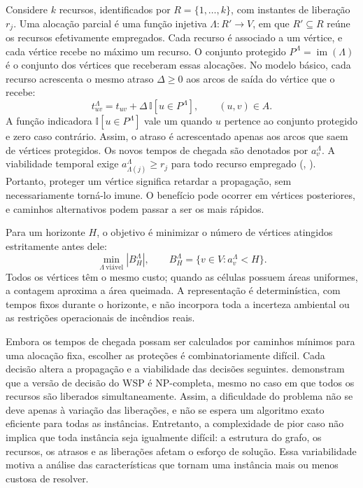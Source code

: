 Considere $k$ recursos, identificados por $R=\{1,\ldots,k\}$, com instantes
de liberação $r_j$. Uma alocação parcial é uma função injetiva
$\Lambda:R'\rightarrow V$, em que $R'\subseteq R$ reúne os recursos
efetivamente empregados. Cada recurso é associado a um vértice, e cada
vértice recebe no máximo um recurso. O conjunto protegido
$P^{\Lambda}=\operatorname{im}(\Lambda)$ é o conjunto dos vértices
que receberam essas alocações. No modelo básico,
cada recurso acrescenta o mesmo atraso $\Delta\geq0$ aos arcos de saída
do vértice que o recebe:
\begin{equation}
 t_{uv}^{\Lambda}=t_{uv}+\Delta\,\mathbb{I}[u\in P^{\Lambda}],
 \qquad (u,v)\in A.
 \label{eq:tempo-propagacao-alocacao}
\end{equation}
\noindent A função indicadora $\mathbb{I}[u\in P^{\Lambda}]$ vale um quando
$u$ pertence ao conjunto protegido e zero caso contrário. Assim, o atraso
é acrescentado apenas aos arcos que saem de vértices protegidos. Os novos
tempos de chegada são denotados por $a_v^{\Lambda}$. A viabilidade temporal exige
$a_{\Lambda(j)}^{\Lambda}\geq r_j$ para todo recurso empregado
(\citeauthor{DelazeriRitt2024}, \citeyear{DelazeriRitt2024,DelazeriRitt2026}). Portanto, proteger um vértice
significa retardar a propagação, sem necessariamente torná-lo imune.
O benefício pode ocorrer em vértices posteriores, e caminhos alternativos
podem passar a ser os mais rápidos.

Para um horizonte $H$, o objetivo é minimizar o número de vértices
atingidos estritamente antes dele:
\begin{equation}
 \min_{\Lambda\ \text{viável}} |B_H^{\Lambda}|,
 \qquad B_H^{\Lambda}=\{v\in V:a_v^{\Lambda}<H\}.
 \label{eq:objetivo-wsp}
\end{equation}
\noindent Todos os vértices têm o mesmo custo; quando as células possuem
áreas uniformes, a contagem aproxima a área queimada. A representação é
determinística, com tempos fixos durante o horizonte, e não incorpora toda
a incerteza ambiental ou as restrições operacionais de incêndios reais.

Embora os tempos de chegada possam ser calculados por caminhos mínimos
para uma alocação fixa, escolher as proteções é combinatoriamente difícil.
Cada decisão altera a propagação e a viabilidade das decisões seguintes.
 demonstram que a versão de decisão do WSP
é NP-completa, mesmo no caso em que todos os recursos são liberados
simultaneamente. Assim, a dificuldade do problema não se deve apenas à
variação das liberações, e não se espera um algoritmo exato eficiente para
todas as instâncias. Entretanto, a complexidade de pior caso não implica
que toda instância seja igualmente difícil: a estrutura do grafo, os
recursos, os atrasos e as liberações afetam o esforço de solução. Essa
variabilidade motiva a análise das características que tornam uma instância
mais ou menos custosa de resolver.

